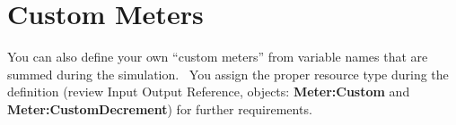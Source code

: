 \section{Custom Meters}\label{custom-meters}

You can also define your own ``custom meters'' from variable names that are summed during the simulation.~ You assign the proper resource type during the definition (review Input Output Reference, objects: \textbf{Meter:Custom} and \textbf{Meter:CustomDecrement}) for further requirements.
